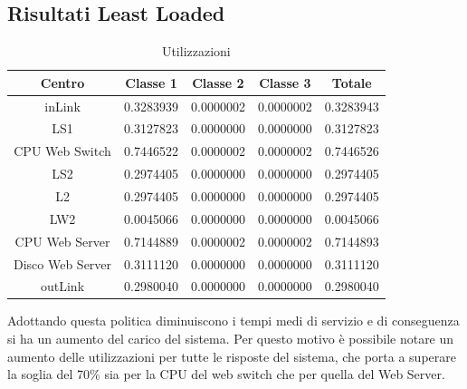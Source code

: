 \subsection{Risultati Least Loaded}
\begin{table}[htbp]
\begin{center}
\begin{tabular}{|c|c|c|c|c|}
\hline
Centro	&Classe 1	&Classe 2	&Classe 3	&Totale\\
\hline
\hline
inLink & 0.3283939 & 0.0000002 & 0.0000002 & 0.3283943 \\ \hline
LS1 & 0.3127823 & 0.0000000 & 0.0000000 & 0.3127823 \\ \hline
CPU Web Switch & 0.7446522 & 0.0000002 & 0.0000002 & 0.7446526 \\ \hline
LS2 & 0.2974405 & 0.0000000 & 0.0000000 & 0.2974405 \\ \hline
L2 & 0.2974405 & 0.0000000 & 0.0000000 & 0.2974405 \\ \hline
LW2 & 0.0045066 & 0.0000000 & 0.0000000 & 0.0045066 \\ \hline
CPU Web Server & 0.7144889 & 0.0000002 & 0.0000002 & 0.7144893 \\ \hline
Disco Web Server & 0.3111120 & 0.0000000 & 0.0000000 & 0.3111120 \\ \hline
outLink & 0.2980040 & 0.0000000 & 0.0000000 & 0.2980040 \\ \hline
\end{tabular}
\end{center}
\caption{Utilizzazioni}
\label{utilizzazioni}
\end{table}
Adottando questa politica diminuiscono i tempi medi di servizio e di conseguenza si ha un aumento del carico del sistema. Per questo motivo è possibile notare un aumento delle utilizzazioni per tutte le risposte del sistema, che porta a superare la soglia del 70\% sia per la CPU del web switch che per quella del Web Server.
